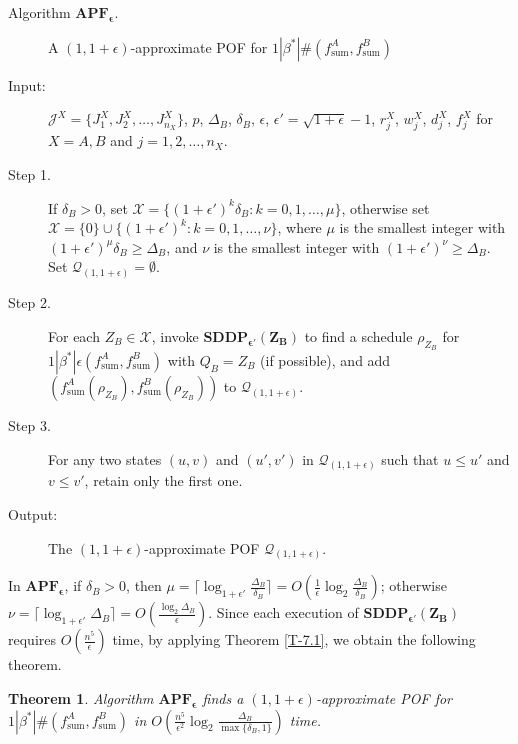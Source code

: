 \documentclass[12pt]{article}
\newtheorem{theorem}{Theorem}[section]
\begin{document}
\begin{sloppypar}
\begin{description}
\item [Algorithm $\mathbf{APF_{\epsilon}}$.] A $(1, 1+\epsilon)$-approximate POF for $1 | \beta^{*}|\#(f_{\mathrm{sum}}^A, f_{\mathrm{sum}}^B)$

\item [Input:] ${\mathcal J}^{X}=\{J_1^{X}, J_2^{X}, \ldots, J_{n_X}^{X}\}$, $p$, $\Delta_B$, $\delta_B$, $\epsilon$, $\epsilon'=\sqrt{1+\epsilon}-1$, $r_j^X$, $w_j^X$, $d_j^X$, $f_j^X$ for $X = A,B$ and $j=1, 2, \ldots, n_X$.

\item [Step 1.] If $\delta_B > 0$, set $\mathcal{X}=\{(1+\epsilon')^k \delta_B: k=0, 1, \ldots, \mu\}$, otherwise set $\mathcal{X}=\{0\} \cup \{(1+\epsilon')^k: k=0, 1, \ldots, \nu\}$, where $\mu$ is the smallest
integer with $(1+\epsilon')^{\mu} \delta_B \geq \Delta_B$, and $\nu$ is the smallest
integer with $(1+\epsilon')^{\nu} \geq \Delta_B$. Set $\mathcal{Q}_{(1, 1+\epsilon)}=\emptyset$.

\item [Step 2.] For each $Z_B \in \mathcal{X}$, invoke $\mathbf{SDDP_{\epsilon'}(Z_B)}$ to find a schedule $\rho_{Z_B}$ for $1 | \beta^{*}|\epsilon(f_{\mathrm{sum}}^A, f_{\mathrm{sum}}^B)$ with $Q_B=Z_B$ (if possible), and add $(f_{\mathrm{sum}}^A(\rho_{Z_B}), f_{\mathrm{sum}}^B(\rho_{Z_B}))$ to $\mathcal{Q}_{(1, 1+\epsilon)}$.

\item [Step 3.] For any two states $(u, v)$ and $(u', v')$ in $\mathcal{Q}_{(1, 1+\epsilon)}$ such that $u \leq u'$ and $v \leq v'$, retain only the first one.

\item [Output:] The $(1, 1+\epsilon)$-approximate POF $\mathcal{Q}_{(1, 1+\epsilon)}$.
\end{description}

In $\mathbf{APF_{\epsilon}}$, if $\delta_B > 0$, then
$\mu= \lceil \log_{1+\epsilon'}\frac{\Delta_B}{\delta_B}\rceil=O(\frac{1}{\epsilon} \log_2 \frac{\Delta_B}{\delta_B})$; otherwise $\nu= \lceil \log_{1+\epsilon'} \Delta_B \rceil=O(\frac{\log_2 \Delta_B}{\epsilon})$. Since each execution of $\mathbf{SDDP_{\epsilon'}(Z_B)}$ requires $O(\frac{n^5}{\epsilon})$ time, by applying Theorem \ref{T-7.1}, we obtain the following theorem.

\begin{theorem} \label{T-7.2}
Algorithm $\mathbf{APF_{\epsilon}}$ finds a $(1, 1+\epsilon)$-approximate
POF for $1 | \beta^{*}|\#(f_{\mathrm{sum}}^A, f_{\mathrm{sum}}^B)$ in $O(\frac{n^5}{\epsilon^2} \log_2 \frac{\Delta_B}{\max\{\delta_B,1\}})$ time.
\end{theorem}


\end{sloppypar}
\end{document}
